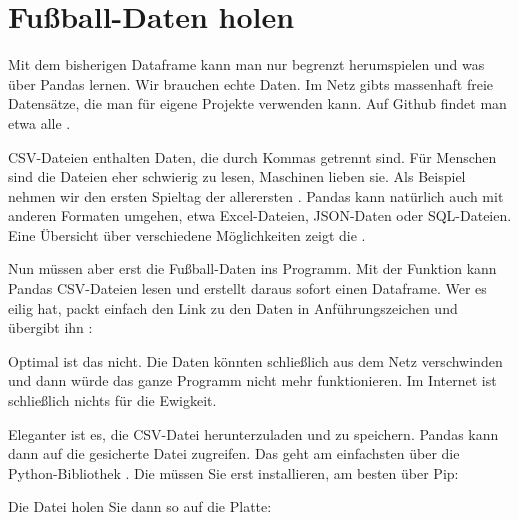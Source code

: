 \section{Fußball-Daten holen}

Mit dem bisherigen Dataframe kann man nur begrenzt herumspielen und was über Pandas lernen. Wir brauchen echte Daten. Im Netz gibts massenhaft freie Datensätze, die man für eigene Projekte verwenden kann. Auf Github findet man etwa alle .



CSV-Dateien enthalten Daten, die durch Kommas getrennt sind. Für Menschen sind die Dateien eher schwierig zu lesen, Maschinen lieben sie. Als Beispiel nehmen wir den ersten Spieltag der allerersten . Pandas kann natürlich auch mit anderen Formaten umgehen, etwa Excel-Dateien, JSON-Daten oder SQL-Dateien. Eine Übersicht über verschiedene Möglichkeiten zeigt die .

	
Nun müssen aber erst die Fußball-Daten ins Programm. Mit der Funktion  kann Pandas CSV-Dateien lesen und erstellt daraus sofort einen Dataframe. Wer es eilig hat, packt einfach den Link zu den Daten in Anführungszeichen und übergibt ihn :

\medskip


\medskip

Optimal ist das nicht. Die Daten könnten schließlich aus dem Netz verschwinden und dann würde das ganze Programm nicht mehr funktionieren. Im Internet ist schließlich nichts für die Ewigkeit.

Eleganter ist es, die CSV-Datei herunterzuladen und zu speichern. Pandas kann dann auf die gesicherte Datei zugreifen. Das geht am einfachsten über die Python-Bibliothek . Die müssen Sie erst installieren, am besten über Pip:

\medskip



\medskip

Die Datei holen Sie dann so auf die Platte:

